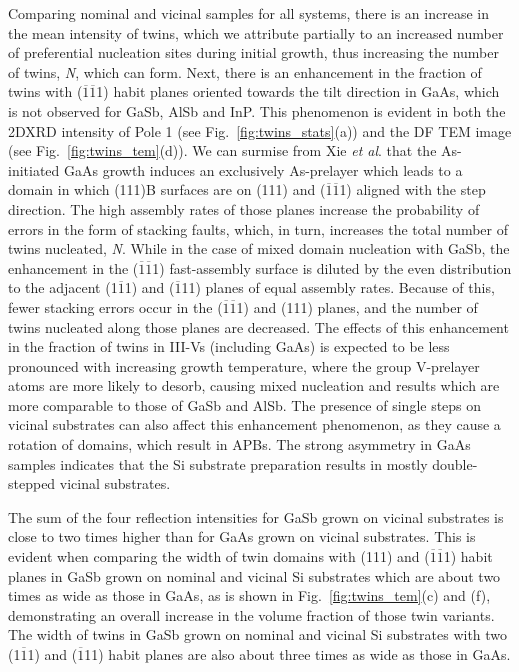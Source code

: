 Comparing nominal and vicinal samples for all systems, there is an increase in the mean intensity of twins, which we attribute partially to an increased number of preferential nucleation sites during initial growth, thus increasing the number of twins, \textit{N}, which can form. Next, there is an enhancement in the fraction of twins with ($\overline{1}\overline{1}$1) habit planes oriented towards the tilt direction in GaAs, which is not observed for GaSb, AlSb and InP. This phenomenon is evident in both the 2DXRD intensity of Pole 1 (see Fig.~\ref{fig:twins_stats}(a)) and the DF TEM image (see Fig.~\ref{fig:twins_tem}(d)). We can surmise from Xie \textit{et al}. that the As-initiated GaAs growth induces an exclusively As-prelayer which leads to a domain in which (111)B surfaces are on (111) and ($\overline{1}\overline{1}$1) aligned with the step direction. The high assembly rates of those planes increase the probability of errors in the form of stacking faults, which, in turn, increases the total number of twins nucleated, \textit{N}. While in the case of mixed domain nucleation with GaSb, the enhancement in the ($\overline{1}\overline{1}$1) fast-assembly surface is diluted by the even distribution to the adjacent (1$\overline{1}$1) and ($\overline{1}$11) planes of equal assembly rates. Because of this, fewer stacking errors occur in the ($\overline{1}\overline{1}$1) and (111) planes, and the number of twins nucleated along those planes are decreased. The effects of this enhancement in the fraction of twins in III-Vs (including GaAs) is expected to be less pronounced with increasing growth temperature, where the group V-prelayer atoms are more likely to desorb, causing mixed nucleation and results which are more comparable to those of GaSb and AlSb. The presence of single steps on vicinal substrates can also affect this enhancement phenomenon, as they cause a rotation of domains, which result in APBs. The strong asymmetry in GaAs samples indicates that the Si substrate preparation results in mostly double-stepped vicinal substrates.

The sum of the four reflection intensities for GaSb grown on vicinal substrates is close to two times higher than for GaAs grown on vicinal substrates. This is evident when comparing the width of twin domains with (111) and ($\overline{1}\overline{1}$1) habit planes in GaSb grown on nominal and vicinal Si substrates which are about two times as wide as those in GaAs, as is shown in Fig.~\ref{fig:twins_tem}(c) and (f), demonstrating an overall increase in the volume fraction of those twin variants. The width of twins in GaSb grown on nominal and vicinal Si substrates with two (1$\overline{1}$1) and ($\overline{1}$11) habit planes are also about three times as wide as those in GaAs.

